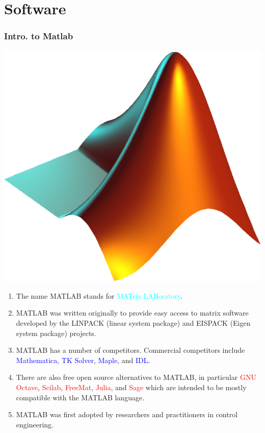 \documentclass[hyperref={pdfpagelabels=true}]{beamer}
\begin{document}
\section{Software}
\begin{frame}[shrink]
\frametitle{Intro. to Matlab}
\begin{flushright}
\includegraphics[scale = 0.08]{figs/Selection_035.png}
\end{flushright}
\begin{enumerate}
\item<1-> The name MATLAB stands for \textcolor{cyan}{MATrix LABoratory}. 
\item<2-> MATLAB was written originally to provide easy access to matrix software developed by the LINPACK (linear system package) and EISPACK (Eigen system package) projects.
\item<3-> MATLAB has a number of competitors. Commercial competitors include \textcolor{blue}{Mathematica}, \textcolor{blue}{ TK Solver}, \textcolor{blue}{Maple}, and  \textcolor{blue}{IDL}.
\item<4-> There are also free open source alternatives to MATLAB, in particular  \textcolor{red}{GNU Octave}, \textcolor{red}{Scilab}, \textcolor{red}{FreeMat}, \textcolor{red}{Julia}, and \textcolor{red}{Sage} which are intended to be mostly compatible with the MATLAB language.
\item<5-> MATLAB was first adopted by researchers and practitioners in control engineering.
\end{enumerate}
\end{frame}
\end{document}
